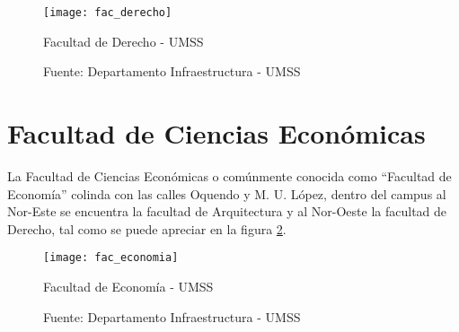  \begin{figure}[H]
   \begin{center}
     \texttt{[image: fac\_derecho]}
     \caption{Facultad de Derecho - UMSS}
     \label{fig:fac_derecho}
     \caption*{Fuente: Departamento Infraestructura - UMSS}

   \end{center}
 \end{figure}









\section{Facultad de Ciencias Económicas}
\label{sec:facultad_economia}

      La Facultad de Ciencias Económicas o comúnmente conocida como ``Facultad de Economía''
      colinda con las calles Oquendo y M. U. López, dentro del campus al Nor-Este se encuentra la facultad de Arquitectura y al Nor-Oeste la facultad de Derecho, tal como se puede apreciar en la figura \ref{fig:fac_economia}.

      \begin{figure}[H]
       \begin{center}
         \texttt{[image: fac\_economia]}
         \caption{Facultad de Economía - UMSS}
         \label{fig:fac_economia}
         \caption*{Fuente: Departamento Infraestructura - UMSS}

       \end{center}
      \end{figure}






